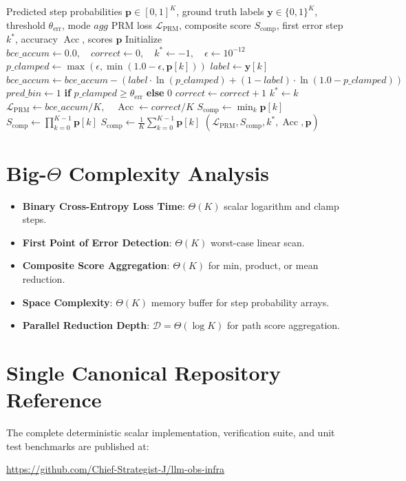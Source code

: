\documentclass[11pt,a4paper]{article}
\theoremstyle{definition}
\begin{document}
\begin{algorithm}[H]
\caption{Process Reward Model (PRM) Evaluation and Step Telemetry}
\begin{algorithmic}[1]
\Require Predicted step probabilities $\mathbf{p} \in [0, 1]^K$, ground truth labels $\mathbf{y} \in \{0, 1\}^K$, threshold $\theta_{\text{err}}$, mode $agg$
\Ensure PRM loss $\mathcal{L}_{\text{PRM}}$, composite score $S_{\text{comp}}$, first error step $k^*$, accuracy $\operatorname{Acc}$, scores $\mathbf{p}$
\State Initialize $bce\_accum \gets 0.0, \quad correct \gets 0, \quad k^* \gets -1, \quad \epsilon \gets 10^{-12}$
    \State $p\_clamped \gets \max(\epsilon, \min(1.0 - \epsilon, \mathbf{p}[k]))$
    \State $label \gets \mathbf{y}[k]$
    \State $bce\_accum \gets bce\_accum - (label \cdot \ln(p\_clamped) + (1 - label) \cdot \ln(1.0 - p\_clamped))$
    \State $pred\_bin \gets 1$ \textbf{if} $p\_clamped \ge \theta_{\text{err}}$ \textbf{else} $0$
     \State $correct \gets correct + 1$ \EndIf
        \State $k^* \gets k$
    \EndIf
\EndFor
\State $\mathcal{L}_{\text{PRM}} \gets bce\_accum / K, \quad \operatorname{Acc} \gets correct / K$
    \State $S_{\text{comp}} \gets \min_{k} \mathbf{p}[k]$
    \State $S_{\text{comp}} \gets \prod_{k=0}^{K-1} \mathbf{p}[k]$
\Else
    \State $S_{\text{comp}} \gets \frac{1}{K}\sum_{k=0}^{K-1} \mathbf{p}[k]$
\EndIf
\State \Return $(\mathcal{L}_{\text{PRM}}, S_{\text{comp}}, k^*, \operatorname{Acc}, \mathbf{p})$
\end{algorithmic}
\end{algorithm}

\section{Big-$\Theta$ Complexity Analysis}

\begin{itemize}
    \item \textbf{Binary Cross-Entropy Loss Time}: $\Theta(K)$ scalar logarithm and clamp steps.
    \item \textbf{First Point of Error Detection}: $\Theta(K)$ worst-case linear scan.
    \item \textbf{Composite Score Aggregation}: $\Theta(K)$ for min, product, or mean reduction.
    \item \textbf{Space Complexity}: $\Theta(K)$ memory buffer for step probability arrays.
    \item \textbf{Parallel Reduction Depth}: $\mathcal{D} = \Theta(\log K)$ for path score aggregation.
\end{itemize}

\section{Single Canonical Repository Reference}

The complete deterministic scalar implementation, verification suite, and unit test benchmarks are published at:
\begin{center}
\url{https://github.com/Chief-Strategist-J/llm-obs-infra}
\end{center}
\end{document}
